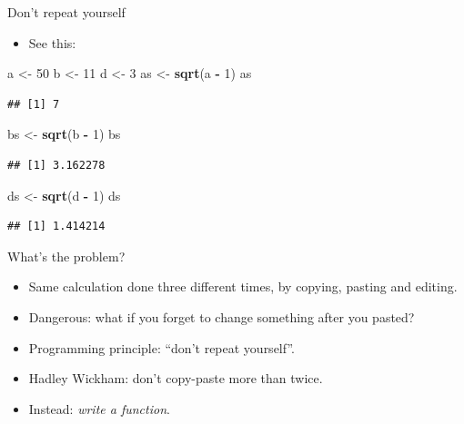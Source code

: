 \documentclass[ignorenonframetext,]{beamer}
\newenvironment{Shaded}{\begin{snugshade}}{\end{snugshade}}
\newcommand{\DecValTok}[1]{\textcolor[rgb]{0.00,0.00,0.81}{#1}}
\newcommand{\KeywordTok}[1]{\textcolor[rgb]{0.13,0.29,0.53}{\textbf{#1}}}
\newcommand{\NormalTok}[1]{#1}
\newcommand{\OperatorTok}[1]{\textcolor[rgb]{0.81,0.36,0.00}{\textbf{#1}}}
\newcommand{\StringTok}[1]{\textcolor[rgb]{0.31,0.60,0.02}{#1}}
\providecommand{\tightlist}{%
  \setlength{\itemsep}{0pt}\setlength{\parskip}{0pt}}
\begin{document}
\begin{frame}[fragile]{Don't repeat yourself}
\protect\hypertarget{dont-repeat-yourself}{}

\begin{itemize}
\tightlist
\item
  See this:
\end{itemize}

\begin{Shaded}
\begin{Highlighting}[]
\NormalTok{a <-}\StringTok{ }\DecValTok{50}
\NormalTok{b <-}\StringTok{ }\DecValTok{11}
\NormalTok{d <-}\StringTok{ }\DecValTok{3}
\NormalTok{as <-}\StringTok{ }\KeywordTok{sqrt}\NormalTok{(a }\OperatorTok{-}\StringTok{ }\DecValTok{1}\NormalTok{)}
\NormalTok{as}
\end{Highlighting}
\end{Shaded}

\begin{verbatim}
## [1] 7
\end{verbatim}

\begin{Shaded}
\begin{Highlighting}[]
\NormalTok{bs <-}\StringTok{ }\KeywordTok{sqrt}\NormalTok{(b }\OperatorTok{-}\StringTok{ }\DecValTok{1}\NormalTok{)}
\NormalTok{bs}
\end{Highlighting}
\end{Shaded}

\begin{verbatim}
## [1] 3.162278
\end{verbatim}

\begin{Shaded}
\begin{Highlighting}[]
\NormalTok{ds <-}\StringTok{ }\KeywordTok{sqrt}\NormalTok{(d }\OperatorTok{-}\StringTok{ }\DecValTok{1}\NormalTok{)}
\NormalTok{ds}
\end{Highlighting}
\end{Shaded}

\begin{verbatim}
## [1] 1.414214
\end{verbatim}

\end{frame}

\begin{frame}{What's the problem?}
\protect\hypertarget{whats-the-problem}{}

\begin{itemize}
\item
  Same calculation done three different times, by copying, pasting and
  editing.
\item
  Dangerous: what if you forget to change something after you pasted?
\item
  Programming principle: ``don't repeat yourself''.
\item
  Hadley Wickham: don't copy-paste more than twice.
\item
  Instead: \emph{write a function}.
\end{itemize}

\end{frame}
\end{document}
